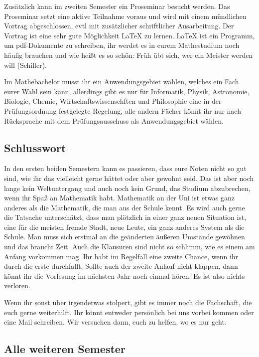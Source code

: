 Zusätzlich kann im zweiten Semester ein Proseminar besucht werden. Das Proseminar setzt eine aktive Teilnahme voraus und wird mit einem mündlichen Vortrag abgeschlossen, evtl mit zusätzlicher schriftlicher Ausarbeitung.  Der Vortrag ist eine sehr gute Möglichkeit LaTeX zu lernen.  LaTeX ist ein Programm, um pdf-Dokumente zu schreiben, ihr werdet es in eurem Mathestudium noch häufig brauchen und wie heißt es so schön: Früh übt sich, wer ein Meister werden will (Schiller).


Im Mathebachelor müsst ihr ein Anwendungsgebiet wählen, welches ein Fach eurer Wahl sein kann, allerdings gibt es nur für Informatik, Physik, Astronomie, Biologie, Chemie, Wirtschaftswissenschften und Philosophie eine in der Prüfungsordnung festgelegte Regelung, alle andern Fächer könnt ihr nur nach Rücksprache mit dem Prüfungsausschuss als Anwendungsgebiet wählen.

\subsection{Schlusswort}

In den ersten beiden Semestern kann es passieren, dass eure Noten nicht so gut sind, wie ihr das vielleicht gerne hättet oder aber gewohnt seid.  Das ist aber noch lange kein Weltuntergang und auch noch kein Grund, das Studium abzubrechen, wenn ihr Spaß an Mathematik habt. Mathematik an der Uni ist etwas ganz anderes als die Mathematik, die man aus der Schule kennt.  Es wird auch gerne die Tatsache unterschätzt, dass man plötzlich in einer ganz neuen Situation ist, eine für die meisten fremde Stadt, neue Leute, ein ganz anderes System als die Schule.  Man muss sich erstmal an die geänderten äußeren Umstände gewöhnen und das braucht Zeit.  Auch die Klausuren sind nicht so schlimm, wie es einem am Anfang vorkommen mag.  Ihr habt im Regelfall eine zweite Chance, wenn ihr durch die erste durchfallt.  Sollte auch der zweite Anlauf nicht klappen, dann könnt ihr die Vorlesung im nächsten Jahr noch einmal hören. Es ist also nichts verloren.

Wenn ihr sonst über irgendetwas stolpert, gibt es immer noch die Fachschaft, die euch gerne weiterhilft. Ihr könnt entweder persönlich bei uns vorbei kommen oder eine Mail schreiben. Wir versuchen dann, euch zu helfen, wo es nur geht.


\subsection{Alle weiteren Semester}

